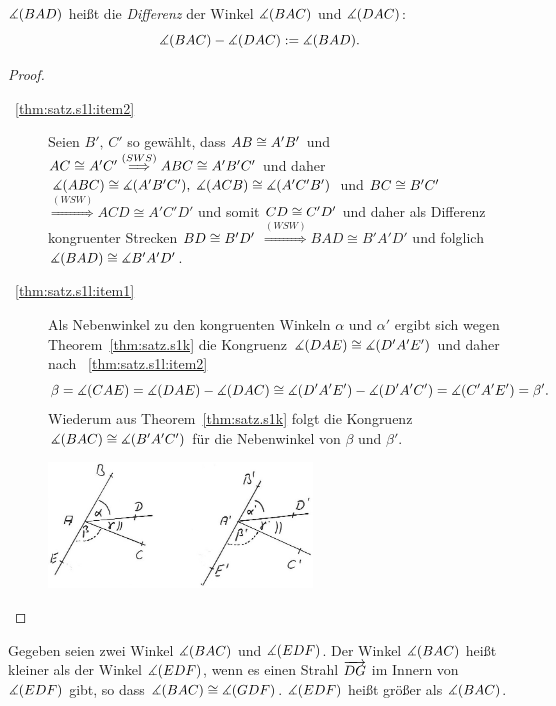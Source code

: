 $\mbox{$\measuredangle$}(BAD)$ heißt die \emph{Differenz} der Winkel $\mbox{$\measuredangle$}(BAC)$ und $\mbox{$\measuredangle$}(DAC)$:
$$
    \mbox{$\measuredangle$}(BAC) - \mbox{$\measuredangle$}(DAC) := \mbox{$\measuredangle$}(BAD).
$$
\begin{proof}
    \begin{description}
        \item[~\ref{thm:satz.s1l:item2}] Seien $B',\, C'$ so gewählt, dass ${AB} \cong
            {A'B'}$ und ${AC} \cong {A'C'} \stackrel{(SWS)}{\Longrightarrow} ABC \cong
            A'B'C'$ und daher $\mbox{$\measuredangle$}(ABC) \cong \mbox{$\measuredangle$}(A'B'C'),\; \mbox{$\measuredangle$}(ACB) \cong \mbox{$\measuredangle$}(A'C'B')$ und
            ${BC} \cong {B'C'}$ $\stackrel{(WSW)}{\Longrightarrow} ACD \cong  A'C'D'$ und
            somit ${CD} \cong {C'D'}$ und daher als Differenz kongruenter Strecken ${BD}
            \cong {B'D'}$
            $\stackrel{(WSW)}{\Longrightarrow} BAD \cong B'A'D'$ und folglich $\mbox{$\measuredangle$}(BAD) \cong
            \mbox{$\measuredangle$}{B'A'D'}$.

        \item[~\ref{thm:satz.s1l:item1}] Als Nebenwinkel zu den kongruenten Winkeln $\alpha$ und
            $\alpha'$ ergibt sich wegen Theorem~\ref{thm:satz.s1k} die Kongruenz $\mbox{$\measuredangle$}(DAE) \cong
            \mbox{$\measuredangle$}(D'A'E')$ und daher nach ~\ref{thm:satz.s1l:item2}
            $$
                \beta = \mbox{$\measuredangle$}(CAE) = \mbox{$\measuredangle$}(DAE) - \mbox{$\measuredangle$}(DAC) \cong \mbox{$\measuredangle$}(D'A'E') - \mbox{$\measuredangle$}(D'A'C') = \mbox{$\measuredangle$}(C'A'E') =
                \beta'.
            $$
            Wiederum aus Theorem~\ref{thm:satz.s1k} folgt die Kongruenz $\mbox{$\measuredangle$}(BAC) \cong \mbox{$\measuredangle$}(B'A'C')$
            für die Nebenwinkel von $\beta$ und $\beta'$.

            \centerline{\includegraphics[width=7cm]{BILDER/1-2-15a-Winkel.jpg}}
    \end{description}
\end{proof}

\begin{defi}
    Gegeben seien zwei Winkel $\mbox{$\measuredangle$}(BAC)$ und $\mbox{$\measuredangle$}(EDF)$. Der Winkel $\mbox{$\measuredangle$}(BAC)$ heißt kleiner als der
    Winkel $\mbox{$\measuredangle$}(EDF)$, wenn es einen Strahl $\mbox{${\overrightarrow{DG}}$}$ im Innern von $\mbox{$\measuredangle$}(EDF)$ gibt, so dass
    $\mbox{$\measuredangle$}(BAC) \cong \mbox{$\measuredangle$}(GDF)$. $\mbox{$\measuredangle$}(EDF)$ heißt größer als $\mbox{$\measuredangle$}(BAC)$.
\end{defi}

